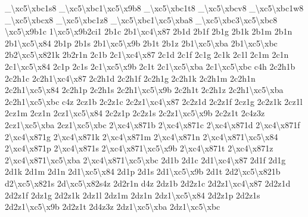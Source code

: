 \begin{DoxyCompactItemize}
\-\_\textbackslash{}xc5\textbackslash{}xbc1s8 \-\_\textbackslash{}xc5\textbackslash{}xbc1\textbackslash{}xc5\textbackslash{}x9b8 \-\_\textbackslash{}xc5\textbackslash{}xbc1t8 \-\_\-\textbackslash{}xc5\textbackslash{}xbcv8 \-\_\textbackslash{}xc5\textbackslash{}xbc1w8 \-\_\-\textbackslash{}xc5\textbackslash{}xbcx8 \-\_\textbackslash{}xc5\textbackslash{}xbc1z8 \-\_\textbackslash{}xc5\textbackslash{}xbc1\textbackslash{}xc5\textbackslash{}xba8 \-\_\textbackslash{}xc5\textbackslash{}xbc3\textbackslash{}xc5\textbackslash{}xbc8 \textbackslash{}xc5\textbackslash{}x9b1c 1\textbackslash{}xc5\textbackslash{}x9b2ci1 2b1c 2b1\textbackslash{}xc4\textbackslash{}x87 2b1d 2b1f 2b1g 2b1k 2b1m 2b1n 2b1\textbackslash{}xc5\textbackslash{}x84 2b1p 2b1s 2b1\textbackslash{}xc5\textbackslash{}x9b 2b1t 2b1z 2b1\textbackslash{}xc5\textbackslash{}xba 2b1\textbackslash{}xc5\textbackslash{}xbc 2b2\textbackslash{}xc5\textbackslash{}x821k 2b2r1n 2c1b 2c1\textbackslash{}xc4\textbackslash{}x87 2c1d 2c1f 2c1g 2c1k 2c1l 2c1m 2c1n 2c1\textbackslash{}xc5\textbackslash{}x84 2c1p 2c1s 2c1\textbackslash{}xc5\textbackslash{}x9b 2c1t 2c1\textbackslash{}xc5\textbackslash{}xba 2c1\textbackslash{}xc5\textbackslash{}xbc c4h 2c2h1b 2c2h1c 2c2h1\textbackslash{}xc4\textbackslash{}x87 2c2h1d 2c2h1f 2c2h1g 2c2h1k 2c2h1m 2c2h1n 2c2h1\textbackslash{}xc5\textbackslash{}x84 2c2h1p 2c2h1s 2c2h1\textbackslash{}xc5\textbackslash{}x9b 2c2h1t 2c2h1z 2c2h1\textbackslash{}xc5\textbackslash{}xba 2c2h1\textbackslash{}xc5\textbackslash{}xbc c4z 2cz1b 2c2z1c 2c2z1\textbackslash{}xc4\textbackslash{}x87 2c2z1d 2c2z1f 2cz1g 2c2z1k 2cz1l 2cz1m 2cz1n 2cz1\textbackslash{}xc5\textbackslash{}x84 2c2z1p 2c2z1s 2c2z1\textbackslash{}xc5\textbackslash{}x9b 2c2z1t 2c4z3z 2cz1\textbackslash{}xc5\textbackslash{}xba 2cz1\textbackslash{}xc5\textbackslash{}xbc 2\textbackslash{}xc4\textbackslash{}x871b 2\textbackslash{}xc4\textbackslash{}x871c 2\textbackslash{}xc4\textbackslash{}x871d 2\textbackslash{}xc4\textbackslash{}x871f 2\textbackslash{}xc4\textbackslash{}x871g 2\textbackslash{}xc4\textbackslash{}x871k 2\textbackslash{}xc4\textbackslash{}x871m 2\textbackslash{}xc4\textbackslash{}x871n 2\textbackslash{}xc4\textbackslash{}x871\textbackslash{}xc5\textbackslash{}x84 2\textbackslash{}xc4\textbackslash{}x871p 2\textbackslash{}xc4\textbackslash{}x871s 2\textbackslash{}xc4\textbackslash{}x871\textbackslash{}xc5\textbackslash{}x9b 2\textbackslash{}xc4\textbackslash{}x871t 2\textbackslash{}xc4\textbackslash{}x871z 2\textbackslash{}xc4\textbackslash{}x871\textbackslash{}xc5\textbackslash{}xba 2\textbackslash{}xc4\textbackslash{}x871\textbackslash{}xc5\textbackslash{}xbc 2d1b 2d1c 2d1\textbackslash{}xc4\textbackslash{}x87 2d1f 2d1g 2d1k 2d1m 2d1n 2d1\textbackslash{}xc5\textbackslash{}x84 2d1p 2d1s 2d1\textbackslash{}xc5\textbackslash{}x9b 2d1t 2d2\textbackslash{}xc5\textbackslash{}x821b d2\textbackslash{}xc5\textbackslash{}x821s 2d\textbackslash{}xc5\textbackslash{}x82s4z 2d2r1n d4z 2dz1b 2d2z1c 2d2z1\textbackslash{}xc4\textbackslash{}x87 2d2z1d 2d2z1f 2dz1g 2d2z1k 2dz1l 2dz1m 2dz1n 2dz1\textbackslash{}xc5\textbackslash{}x84 2d2z1p 2d2z1s 2d2z1\textbackslash{}xc5\textbackslash{}x9b 2d2z1t 2d4z3z 2dz1\textbackslash{}xc5\textbackslash{}xba 2dz1\textbackslash{}xc5\textbackslash{}xbc 
\end{DoxyCompactItemize}
